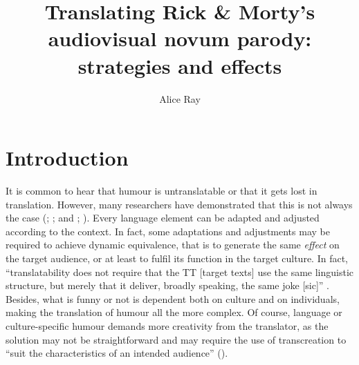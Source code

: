 \documentclass[output=paper]{langscibook}
\author{Alice Ray\orcid{}\affiliation{University of Orléans}}
\title[Translating \textit{Rick \& Morty}’s audiovisual novum parody]{{{Translating} }{Rick} {\&} {Morty{’s} {audiovisual} {novum} {parody:} {strategies} {and} {effects}}}
\begin{document}
\maketitle

\section{Introduction}

It is common to hear that humour is untranslatable or that it gets lost in translation. However, many researchers have demonstrated that this is not always the case (\citealt{Low2011}; \citealt{Hofstadter1998}; \citealt{delabastita_traductio_1997} and \citealt{delabastita_you_1997}; \citealt{Gottlieb1997}). Every language element can be adapted and adjusted according to the context. In fact, some adaptations and adjustments may be required to achieve dynamic equivalence, that is to generate the same \textit{effect} on the target audience, or at least to fulfil its function in the target culture. In fact, “translatability does not require that the TT [target texts] use the same linguistic structure, but merely that it deliver, broadly speaking, the same joke [sic]” \citep[60]{Low2011}. Besides, what is funny or not is dependent both on culture and on individuals, making the translation of humour all the more complex. Of course, language or culture-specific humour demands more creativity from the translator, as the solution may not be straightforward and may require the use of transcreation to “suit the characteristics of an intended audience” (\citealt{Díaz-MillónOlvera-Lobo2021}).
\end{document}
